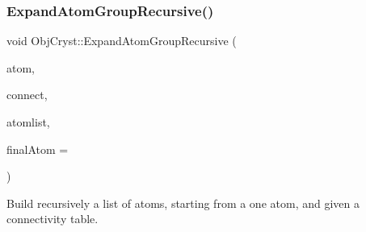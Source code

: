 \subsubsection{\texorpdfstring{ExpandAtomGroupRecursive()}{ExpandAtomGroupRecursive()}\hspace{0.1cm}{\footnotesize\ttfamily [1/2]}}
{\footnotesize\ttfamily void Obj\+Cryst\+::\+Expand\+Atom\+Group\+Recursive (\begin{DoxyParamCaption}\item[{\mbox{\hyperlink{class_obj_cryst_1_1_mol_atom}{Mol\+Atom}} $\ast$}]{atom,  }\item[{const map$<$ \mbox{\hyperlink{class_obj_cryst_1_1_mol_atom}{Mol\+Atom}} $\ast$, set$<$ \mbox{\hyperlink{class_obj_cryst_1_1_mol_atom}{Mol\+Atom}} $\ast$ $>$ $>$ \&}]{connect,  }\item[{set$<$ \mbox{\hyperlink{class_obj_cryst_1_1_mol_atom}{Mol\+Atom}} $\ast$ $>$ \&}]{atomlist,  }\item[{const \mbox{\hyperlink{class_obj_cryst_1_1_mol_atom}{Mol\+Atom}} $\ast$}]{final\+Atom = {} }\end{DoxyParamCaption})}

Build recursively a list of atoms, starting from a one atom, and given a connectivity table.


